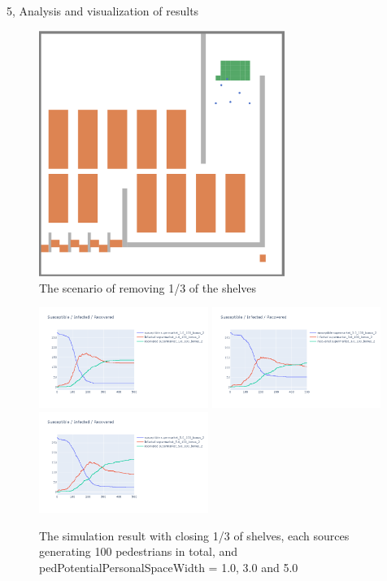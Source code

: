 \documentclass[10pt,a4paper]{article}
\begin{document}
\begin{task}{5, Analysis and visualization of results}
\begin{figure}[H]
    \includegraphics[width=8cm]{images/bonus2.png}
    \centering
    \caption{The scenario of removing 1/3 of the shelves}
    \label{bonus2}
\end{figure}


\begin{figure}[H]
    \includegraphics[width=5.5cm]{images/bonus2_1.0.png}
    \includegraphics[width=5.5cm]{images/bonus2_3.0.png}
    \includegraphics[width=5.5cm]{images/bonus2_5.0.png}
    \centering
    \caption{The simulation result with closing 1/3 of shelves, each sources generating 100 pedestrians in total, and pedPotentialPersonalSpaceWidth = 1.0, 3.0 and 5.0}
    \label{bonus2-2}
\end{figure}


\end{task}
\end{document}
